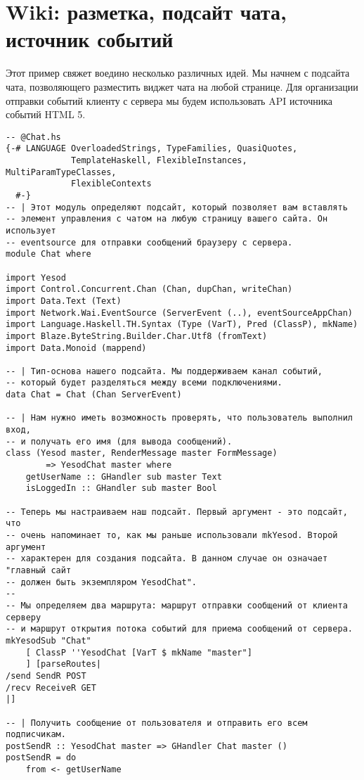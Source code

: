 
\chapter{Wiki: разметка, подсайт чата, источник событий}
\label{}

Этот пример свяжет воедино несколько различных идей. Мы начнем с подсайта чата, позволяющего разместить виджет чата на любой странице. Для организации отправки событий клиенту с сервера мы будем использовать API источника событий HTML 5.

\begin{lstlisting}
-- @Chat.hs
{-# LANGUAGE OverloadedStrings, TypeFamilies, QuasiQuotes,
             TemplateHaskell, FlexibleInstances, MultiParamTypeClasses,
             FlexibleContexts
  #-}
-- | Этот модуль определяют подсайт, который позволяет вам вставлять
-- элемент управления с чатом на любую страницу вашего сайта. Он использует
-- eventsource для отправки сообщений браузеру с сервера.
module Chat where

import Yesod
import Control.Concurrent.Chan (Chan, dupChan, writeChan)
import Data.Text (Text)
import Network.Wai.EventSource (ServerEvent (..), eventSourceAppChan)
import Language.Haskell.TH.Syntax (Type (VarT), Pred (ClassP), mkName)
import Blaze.ByteString.Builder.Char.Utf8 (fromText)
import Data.Monoid (mappend)

-- | Тип-основа нашего подсайта. Мы поддерживаем канал событий,
-- который будет разделяться между всеми подключениями.
data Chat = Chat (Chan ServerEvent)

-- | Нам нужно иметь возможность проверять, что пользователь выполнил вход,
-- и получать его имя (для вывода сообщений).
class (Yesod master, RenderMessage master FormMessage)
        => YesodChat master where
    getUserName :: GHandler sub master Text
    isLoggedIn :: GHandler sub master Bool

-- Теперь мы настраиваем наш подсайт. Первый аргумент - это подсайт, что
-- очень напоминает то, как мы раньше использовали mkYesod. Второй аргумент
-- характерен для создания подсайта. В данном случае он означает "главный сайт
-- должен быть экземпляром YesodChat".
--
-- Мы определяем два маршрута: маршрут отправки сообщений от клиента серверу
-- и маршрут открытия потока событий для приема сообщений от сервера.
mkYesodSub "Chat"
    [ ClassP ''YesodChat [VarT $ mkName "master"]
    ] [parseRoutes|
/send SendR POST
/recv ReceiveR GET
|]

-- | Получить сообщение от пользователя и отправить его всем подписчикам.
postSendR :: YesodChat master => GHandler Chat master ()
postSendR = do
    from <- getUserName


\end{lstlisting}
